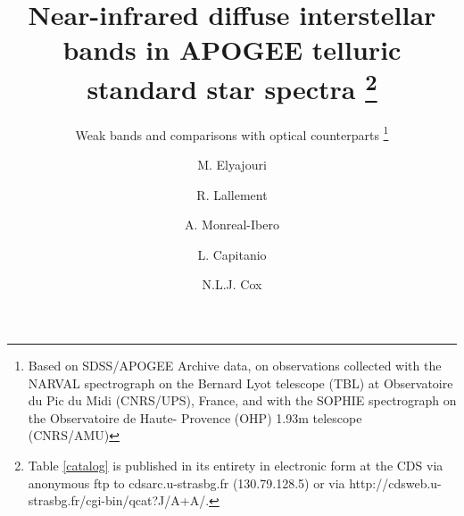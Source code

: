 \documentclass[printer]{aa} %
\begin{document}
 
\title{Near-infrared diffuse interstellar bands in APOGEE telluric standard star spectra \thanks{Table \ref{catalog} is published in its entirety in electronic form
at the CDS via anonymous ftp to cdsarc.u-strasbg.fr (130.79.128.5) or via http://cdsweb.u-strasbg.fr/cgi-bin/qcat?J/A+A/.}}
\subtitle{Weak bands and comparisons with optical counterparts 
\thanks{Based on SDSS/APOGEE Archive data, on observations collected with the NARVAL spectrograph on the Bernard Lyot telescope (TBL) at Observatoire du Pic du Midi (CNRS/UPS), France, and with the SOPHIE spectrograph on the Observatoire de Haute-
Provence (OHP) 1.93m telescope (CNRS/AMU)}}
\author{M. Elyajouri  
          \and
          R. Lallement  
            \and
          A. Monreal-Ibero 
          \and
          L. Capitanio
          \and
          N.L.J. Cox
 }

\end{document}
